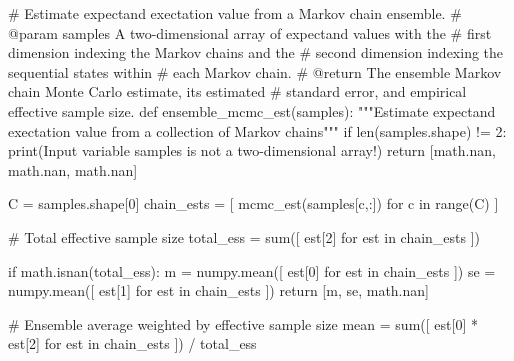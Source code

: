 \documentclass[
  letterpaper,
  DIV=11,
  numbers=noendperiod]{scrartcl}
\newenvironment{Shaded}{\begin{snugshade}}{\end{snugshade}}
\newcommand{\BuiltInTok}[1]{\textcolor[rgb]{0.00,0.23,0.31}{#1}}
\newcommand{\CommentTok}[1]{\textcolor[rgb]{0.37,0.37,0.37}{#1}}
\newcommand{\ControlFlowTok}[1]{\textcolor[rgb]{0.00,0.23,0.31}{#1}}
\newcommand{\DecValTok}[1]{\textcolor[rgb]{0.68,0.00,0.00}{#1}}
\newcommand{\KeywordTok}[1]{\textcolor[rgb]{0.00,0.23,0.31}{#1}}
\newcommand{\NormalTok}[1]{\textcolor[rgb]{0.00,0.23,0.31}{#1}}
\newcommand{\OperatorTok}[1]{\textcolor[rgb]{0.37,0.37,0.37}{#1}}
\newcommand{\StringTok}[1]{\textcolor[rgb]{0.13,0.47,0.30}{#1}}
\begin{document}
\begin{Shaded}
\begin{Highlighting}[]

\CommentTok{\# Estimate expectand exectation value from a Markov chain ensemble.}
\CommentTok{\# @param samples A two{-}dimensional array of expectand values with the }
\CommentTok{\#                first dimension indexing the Markov chains and the }
\CommentTok{\#                second dimension indexing the sequential states within }
\CommentTok{\#                each Markov chain.}
\CommentTok{\# @return The ensemble Markov chain Monte Carlo estimate, its estimated}
\CommentTok{\#         standard error, and empirical effective sample size.}
\KeywordTok{def}\NormalTok{ ensemble\_mcmc\_est(samples):}
  \CommentTok{"""Estimate expectand exectation value from a collection of }
\CommentTok{     Markov chains"""}
  \ControlFlowTok{if} \BuiltInTok{len}\NormalTok{(samples.shape) }\OperatorTok{!=} \DecValTok{2}\NormalTok{:}
    \BuiltInTok{print}\NormalTok{(}\StringTok{\textquotesingle{}Input variable \textasciigrave{}samples\textasciigrave{} is not a two{-}dimensional array!\textquotesingle{}}\NormalTok{)}
    \ControlFlowTok{return}\NormalTok{ [math.nan, math.nan, math.nan]}
    
\NormalTok{  C }\OperatorTok{=}\NormalTok{ samples.shape[}\DecValTok{0}\NormalTok{]}
\NormalTok{  chain\_ests }\OperatorTok{=}\NormalTok{ [ mcmc\_est(samples[c,:]) }\ControlFlowTok{for}\NormalTok{ c }\KeywordTok{in} \BuiltInTok{range}\NormalTok{(C) ]}
  
  \CommentTok{\# Total effective sample size}
\NormalTok{  total\_ess }\OperatorTok{=} \BuiltInTok{sum}\NormalTok{([ est[}\DecValTok{2}\NormalTok{] }\ControlFlowTok{for}\NormalTok{ est }\KeywordTok{in}\NormalTok{ chain\_ests ])}
  
  \ControlFlowTok{if}\NormalTok{ math.isnan(total\_ess):}
\NormalTok{    m  }\OperatorTok{=}\NormalTok{ numpy.mean([ est[}\DecValTok{0}\NormalTok{] }\ControlFlowTok{for}\NormalTok{ est }\KeywordTok{in}\NormalTok{ chain\_ests ])}
\NormalTok{    se }\OperatorTok{=}\NormalTok{ numpy.mean([ est[}\DecValTok{1}\NormalTok{] }\ControlFlowTok{for}\NormalTok{ est }\KeywordTok{in}\NormalTok{ chain\_ests ])}
    \ControlFlowTok{return}\NormalTok{ [m, se, math.nan]}
  
  \CommentTok{\# Ensemble average weighted by effective sample size}
\NormalTok{  mean }\OperatorTok{=} \BuiltInTok{sum}\NormalTok{([ est[}\DecValTok{0}\NormalTok{] }\OperatorTok{*}\NormalTok{ est[}\DecValTok{2}\NormalTok{] }\ControlFlowTok{for}\NormalTok{ est }\KeywordTok{in}\NormalTok{ chain\_ests ]) }\OperatorTok{/}\NormalTok{ total\_ess}
  

\end{Highlighting}
\end{Shaded}
\end{document}
